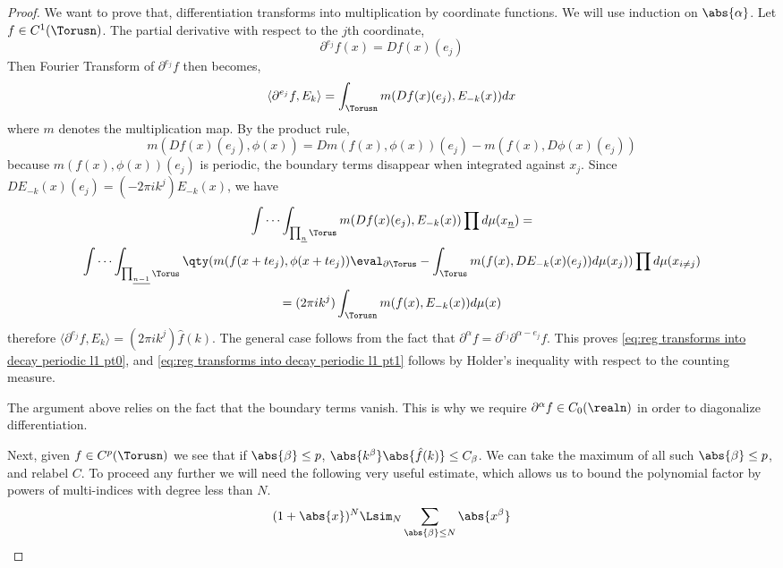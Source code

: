 \documentclass[../main-v2-manifolds.tex]{subfiles}
\begin{document}
\begin{proof}
    We want to prove that, differentiation transforms into multiplication by coordinate functions. We will use induction on $\abs{\alpha}$. Let $f\in C^1(\Torusn)$. The partial derivative with respect to the $j$th coordinate,
    \[
        \partial^{e_j}f(x) = Df(x)(e_j)
    \]
    Then Fourier Transform of $\partial^{e_j}f$ then becomes,
    \[
        \langle \partial^{e_j}f,E_k\rangle = \int_{\Torusn} m(Df(x)(e_j), E_{-k}(x))dx
    \]
    where $m$ denotes the multiplication map. By the product rule,
    \[
        m(Df(x)(e_j), \phi(x)) = Dm(f(x),\phi(x))(e_j) - m(f(x), D\phi(x)(e_j))
    \]
    because $m(f(x), \phi(x))(e_j)$ is periodic, the boundary terms disappear when integrated against $x_j$. Since $D E_{-k}(x)(e_j) = (-2\pi i k^j) E_{-k}(x)$, we have
    \begin{multline}
        \idotsint_{\prod_{\underline{n}}\Torus} m(Df(x)(e_j),E_{-k}(x))\prod d\mu(x_{\underline{n}}) 
        = \\  \idotsint_{\prod_{\underline{n-1}}\Torus} \qty(m(f(x+te_j),\phi(x+te_j))\eval_{\partial\Torus} - \int_\Torus m(f(x), DE_{-k}(x)(e_j)) d\mu(x_j)) \prod d\mu(x_{i\neq j})\\
        =(2\pi i k^j)\int_{\Torusn} m(f(x), E_{-k}(x))d\mu(x)
    \end{multline}
    therefore $\langle \partial^{e_j}f, E_k\rangle = (2\pi i k^j)\hat{f}(k)$. The general case follows from the fact that $\partial^{\alpha}f = \partial^{e_j}\partial^{\alpha-e_j}f$. This proves \cref{eq:reg transforms into decay periodic l1 pt0}, and \cref{eq:reg transforms into decay periodic l1 pt1} follows by Holder's inequality with respect to the counting measure.
    \begin{remark}
        The argument above relies on the fact that the boundary terms vanish. This is why we require $\partial^\alpha f\in C_0(\realn)$ in order to diagonalize differentiation.
    \end{remark}
    Next, given $f\in C^p(\Torusn)$ we see that if $\abs{\beta}\leq p$, $\abs{k^\beta}\abs{\hat{f}(k)}\leq C_{\beta}$. We can take the maximum of all such $\abs{\beta}\leq p$, and relabel $C$. To proceed any further we will need the following very useful estimate, which allows us to bound the polynomial factor by powers of multi-indices with degree less than $N$.
    \begin{equation}
        (1+\abs{x})^N\Lsim_N \sum_{\abs{\beta}\leq N}\abs{x^\beta}
        \label{eq: reg transinto decay small estimate}
    \end{equation}

\end{proof}
\end{document}
